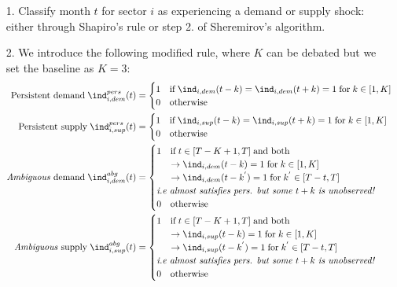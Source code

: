 \begin{itemize}
    \item[1.] Classify month $t$ for sector $i$ as experiencing a demand or supply shock: either through Shapiro's rule or step 2. of Sheremirov's algorithm.
    \item[2.] We introduce the following modified rule, where $K$ can be debated but we set the baseline as $K=3$:
    \begin{align*}
        \textrm{Persistent demand} \; \ind_{i,dem}^{pers}(t) &= \begin{cases} 1 \quad \textrm{if} \; \ind_{i,dem}(t-k)=\ind_{i,dem}(t+k) = 1 \; \textrm{for}\; k \in[1,K] \\ 0 \quad \textrm{otherwise} \end{cases} \\ 
        \textrm{Persistent supply} \; \ind_{i,sup}^{pers}(t) &= \begin{cases} 1 \quad \textrm{if} \; \ind_{i,sup}(t-k)=\ind_{i,sup}(t+k) = 1 \; \textrm{for}\; k \in[1,K] \\ 0 \quad \textrm{otherwise} \end{cases} \\ 
        \textrm{\textit{Ambiguous} demand} \; \ind_{i,dem}^{abg}(t) &= \begin{cases} 1 \quad \textrm{if} \; t\in [T-K+1,T] \; \textrm{and both}\\ \quad \; \; \rightarrow \ind_{i,dem}(t-k)= 1 \; \textrm{for}\; k \in[1,K] \\ \quad \; \; \rightarrow \ind_{i,dem}(t-k^{'})= 1 \; \textrm{for}\; k^{'} \in[T-t,T] \\ \textrm{\textit{i.e almost satisfies pers. but some} $t+k$ \textit{is unobserved!}} \\ 0 \quad \textrm{otherwise} \end{cases} \\ 
        \textrm{\textit{Ambiguous} supply} \; \ind_{i,sup}^{abg}(t) &= \begin{cases} 1 \quad \textrm{if} \; t\in [T-K+1,T] \; \textrm{and both}\\ \quad \; \; \rightarrow \ind_{i,sup}(t-k)= 1 \; \textrm{for}\; k \in[1,K] \\ \quad \; \; \rightarrow \ind_{i,sup}(t-k^{'})= 1 \; \textrm{for}\; k^{'} \in[T-t,T] \\ \textrm{\textit{i.e almost satisfies pers. but some} $t+k$ \textit{is unobserved!}} \\ 0 \quad \textrm{otherwise} \end{cases} \\ 

\end{align*}
\end{itemize}

